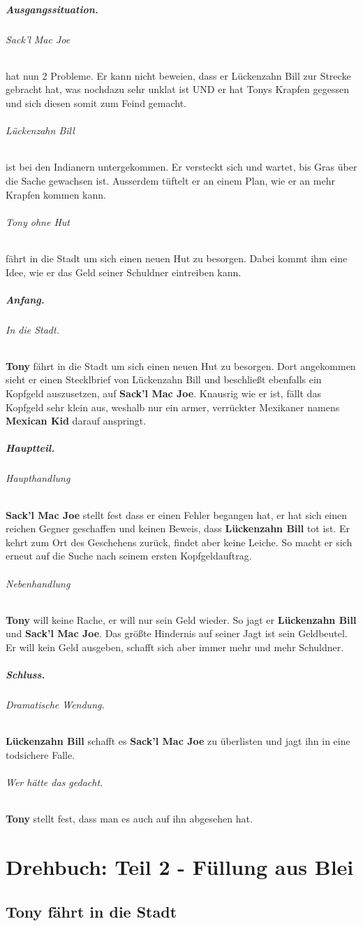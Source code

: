 \documentclass[10pt,a4paper,german]{book}
\begin{document}
\paragraph{Ausgangssituation.}
    \subparagraph{Sack'l Mac Joe} hat nun 2 Probleme.
    Er kann nicht beweien, dass er Lückenzahn Bill zur Strecke gebracht hat, was nochdazu sehr unklat ist UND er hat Tonys Krapfen gegessen und sich diesen somit zum Feind gemacht.
    \subparagraph{Lückenzahn Bill} ist bei den Indianern untergekommen.
    Er versteckt sich und wartet, bis Gras über die Sache gewachsen ist. Ausserdem tüftelt er an einem Plan, wie er an mehr Krapfen kommen kann.
    \subparagraph{Tony ohne Hut} fährt in die Stadt um sich einen neuen Hut zu besorgen.
    Dabei kommt ihm eine Idee, wie er das Geld seiner Schuldner eintreiben kann.

\paragraph{Anfang.}
    \subparagraph{In die Stadt.}
    \textbf{Tony} fährt in die Stadt um sich einen neuen Hut zu besorgen. Dort angekommen sieht er einen Stecklbrief von Lückenzahn Bill und beschließt ebenfalls ein Kopfgeld auszusetzen, auf \textbf{Sack'l Mac Joe}. Knausrig wie er ist, fällt das Kopfgeld sehr klein aus, weshalb nur ein armer, verrückter Mexikaner namens \textbf{Mexican Kid} darauf anspringt.

\paragraph{Hauptteil.}
    
\subparagraph{Haupthandlung}
    \textbf{Sack'l Mac Joe} stellt fest dass er einen Fehler begangen hat, er hat sich einen reichen Gegner geschaffen und keinen Beweis, dass \textbf{Lückenzahn Bill} tot ist. Er kehrt zum Ort des Geschehens zurück, findet aber keine Leiche. So macht er sich erneut auf die Suche nach seinem ersten Kopfgeldauftrag.
\subparagraph{Nebenhandlung}
    \textbf{Tony} will keine Rache, er will nur sein Geld wieder. So jagt er \textbf{Lückenzahn Bill} und \textbf{Sack'l Mac Joe}. Das größte Hindernis auf seiner Jagt ist sein Geldbeutel. Er will kein Geld ausgeben, schafft sich aber immer mehr und mehr Schuldner.

\paragraph{Schluss.}
    \subparagraph{Dramatische Wendung.}
    \textbf{Lückenzahn Bill} schafft es \textbf{Sack'l Mac Joe} zu überlisten und jagt ihn in eine todsichere Falle.
    \subparagraph{Wer hätte das gedacht.}
    \textbf{Tony} stellt fest, dass man es auch auf ihn abgesehen hat.

\chapter{Drehbuch: Teil 2 - Füllung aus Blei}
\section{Tony fährt in die Stadt}
\end{document}
